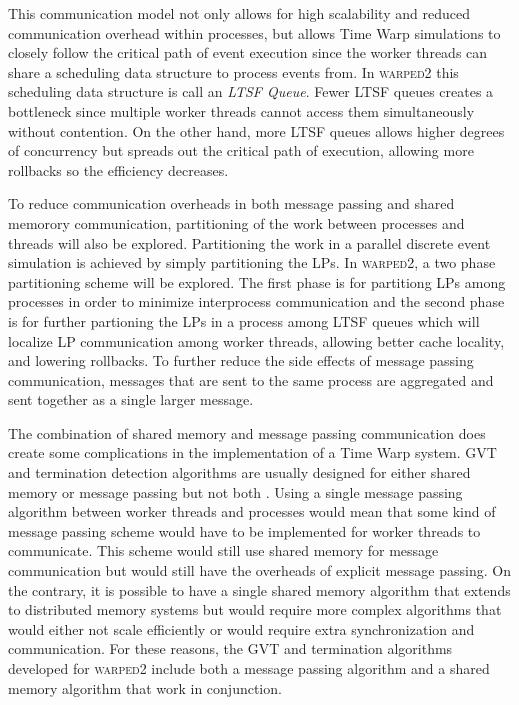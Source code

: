 \documentclass[11pt]{book}
\begin{document}
\noindent
This communication model not only allows for high scalability and reduced communication
overhead within processes, but allows Time Warp simulations to closely follow the critical
path of event execution since the worker threads can share a scheduling data structure to
process events from.  In \textsc{warped2} this scheduling data structure is call an
\emph{LTSF Queue}.  Fewer LTSF queues creates a bottleneck since multiple worker threads
cannot access them simultaneously without contention.  On the other hand, more LTSF queues
allows higher degrees of concurrency but spreads out the critical path of execution,
allowing more rollbacks so the efficiency decreases.

To reduce communication overheads in both message passing and shared memorory communication,
partitioning of the work between processes and threads will also be explored.  Partitioning
the work in a parallel discrete event simulation is achieved by simply partitioning the
LPs.  In \textsc{warped2}, a two phase partitioning scheme will be explored.  The first phase
is for partitiong LPs among processes in order to minimize interprocess communication and the
second phase is for further partioning the LPs in a process among LTSF queues
which will localize LP communication among worker threads, allowing better cache locality,
and lowering rollbacks.  To further reduce the side effects of message passing communication,
messages that are sent to the same process are aggregated and sent together as a single larger
message.


The combination of shared memory and message passing communication does create some
complications in the implementation of a Time Warp system.  GVT and termination detection
algorithms are usually designed for either shared memory or message passing but not both
\cite{}.  Using a single message passing algorithm between worker threads and processes
would mean that some kind of message passing scheme would have to be implemented for
worker threads to communicate.  This scheme would still use shared memory for message
communication but would still have the overheads of explicit message passing.  On the
contrary, it is possible to have a single shared memory algorithm that extends to
distributed memory systems but would require more complex algorithms that would either not
scale efficiently or would require extra synchronization and communication.  For these
reasons, the GVT and termination algorithms developed for \textsc{warped2} include both a
message passing algorithm and a shared memory algorithm that work in conjunction.
\end{document}
